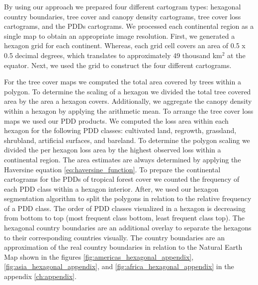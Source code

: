 		By using our approach we prepared four different cartogram types: hexagonal country boundaries, tree cover and canopy density cartograms, tree cover loss cartograms, and the \acp{PDD} cartograms. We processed each continental region as a single map to obtain an appropriate image resolution. First, we generated a hexagon grid for each continent. Whereas, each grid cell covers an area of 0.5 x 0.5 decimal degrees, which translates to approximately 49 thousand km$^2$ at the equator. Next, we used the grid to construct the four different cartograms. 

		For the tree cover maps we computed the total area covered by trees within a polygon. To determine the scaling of a hexagon we divided the total tree covered area by the area a hexagon covers. Additionally, we aggregate the canopy density within a hexagon by applying the arithmetic mean. To arrange the tree cover loss maps we used our \ac{PDD} products. We computed the loss area within each hexagon for the following \ac{PDD} classes: cultivated land, regrowth, grassland, shrubland, artificial surfaces, and bareland. To determine the polygon scaling we divided the per hexagon loss area by the highest observed loss within a continental region. The area estimates are always determined by applying the Haversine equation \ref{eq:haversine_function}. To prepare the continental cartograms for the \acp{PDD} of tropical forest cover we counted the frequency of each \ac{PDD} class within a hexagon interior. After, we used our hexagon segmentation algorithm to split the polygons in relation to the relative frequency of a \ac{PDD} class. The order of \ac{PDD} classes visualized in a hexagon is decreasing from bottom to top (most frequent class bottom, least frequent class top). The hexagonal country boundaries are an additional overlay to separate the hexagons to their corresponding countries visually. The country boundaries are an approximation of the real country boundaries in relation to the Natural Earth Map shown in the figures \ref{fig:americas_hexagonal_appendix}, \ref{fig:asia_hexagonal_appendix}, and \ref{fig:africa_hexagonal_appendix} in the appendix \ref{ch:appendix}.